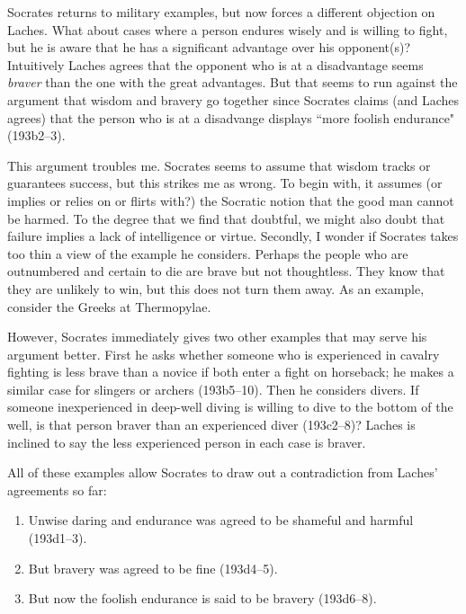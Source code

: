 \documentclass[11pt]{article}
\begin{document}
Socrates returns to military examples, but now forces a different objection
on Laches.  What about cases where a person endures wisely and is willing
to fight, but he is aware that he has a significant advantage over his
opponent(s)?  Intuitively Laches agrees that the opponent who is at
a disadvantage seems \emph{braver} than the one with the great advantages.
But that seems to run against the argument that wisdom and bravery go
together since Socrates claims (and Laches agrees) that the person who is
at a disadvange displays ``more foolish endurance" (193b2--3).

This argument troubles me.  Socrates seems to assume that wisdom tracks or
guarantees success, but this strikes me as wrong.  To begin with, it
assumes (or implies or relies on or flirts with?) the Socratic notion that
the good man cannot be harmed.  To the degree that we find that doubtful,
we might also doubt that failure implies a lack of intelligence or virtue.
Secondly, I wonder if Socrates takes too thin a view of the example he
considers.  Perhaps the people who are outnumbered and certain to die are
brave but not thoughtless.  They know that they are unlikely to win, but
this does not turn them away.  As an example, consider the Greeks at
Thermopylae.

However, Socrates immediately gives two other examples that may serve his
argument better.  First he asks whether someone who is experienced in
cavalry fighting is less brave than a novice if both enter a fight on
horseback; he makes a similar case for slingers or archers (193b5--10).
Then he considers divers.  If someone inexperienced in deep-well diving is
willing to dive to the bottom of the well, is that person braver than an
experienced diver (193c2--8)?  Laches is inclined to say the less
experienced person in each case is braver.

All of these examples allow Socrates to draw out a contradiction from
Laches' agreements so far:

\begin{enumerate}

    \item Unwise daring and endurance was agreed to be shameful and harmful
        (193d1--3).

    \item But bravery was agreed to be fine (193d4--5).

    \item But now the foolish endurance is said to be bravery (193d6--8).

\end{enumerate}
\end{document}
